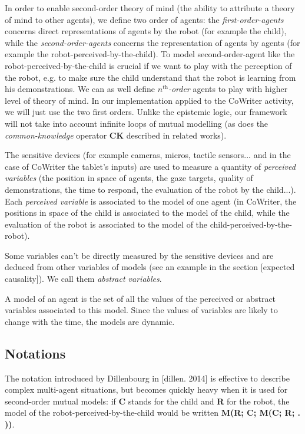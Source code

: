 \documentclass[10pt,a4paper,twocolumn]{article}
\begin{document}
In order to enable second-order theory of mind (the ability to attribute a theory of mind to other agents), we define two order of agents: the \textit{first-order-agents} concerns direct representations of agents by the robot (for example the child), while the \textit{second-order-agents} concerns the representation of agents by agents (for example the robot-perceived-by-the-child). To model second-order-agent like the robot-perceived-by-the-child is crucial if we want to play with the perception of the robot, e.g. to make sure the child understand that the robot is learning from his demonstrations. We can as well define \textit{$n^{\textit{th}}$-order} agents to play with higher level of theory of mind. In our implementation applied to the CoWriter activity, we will just use the two first orders. Unlike the epistemic logic, our framework will not take into account infinite loops of mutual modelling (as does the \textit{common-knowledge} operator \textbf{CK} described in related works). 

The sensitive devices (for example cameras, micros, tactile sensors... and in the case of CoWriter the tablet's inputs) are used to measure a quantity of \textit{perceived variables} (the position in space of agents, the gaze targets, quality of demonstrations, the time to respond, the evaluation of the robot by the child...). Each \textit{perceived variable} is associated to the model of one agent (in CoWriter, the positions in space of the child is associated to the model of the child, while the evaluation of the robot is associated to the model of the child-perceived-by-the-robot). 

Some variables can't be directly measured by the sensitive devices and are deduced from other variables of models (see an example in the section [expected causality]). We call them \textit{abstract variables}. 

A model of an agent is the set of all the values of the perceived or abstract variables associated to this model. Since the values of variables are likely to change with the time, the models are dynamic.

\subsection{Notations}

The notation introduced by Dillenbourg in [dillen. 2014] is effective to describe complex multi-agent situations, but becomes quickly heavy when it is used for second-order mutual models: if \textbf{C} stands for the child and \textbf{R} for the robot, the model of the robot-perceived-by-the-child would be written \textbf{M(R; C; M(C; R; . ))}.
\end{document}
